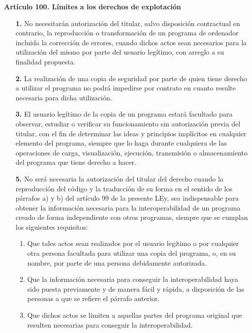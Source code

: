 \textbf{Artículo 100. Límites a los derechos de explotación}
\begin{itemize}
    \item[\textbf{1.}] No necesitarán autorización del titular, salvo disposición contractual en contrario, la reproducción o transformación de un programa de ordenador incluida la corrección de errores, cuando dichos actos sean necesarios para la utilización del mismo por parte del usuario legítimo, con arreglo a su finalidad propuesta.
    \item[\textbf{2.}] La realización de una copia de seguridad por parte de quien tiene derecho a utilizar el programa no podrá impedirse por contrato en cuanto resulte necesaria para dicha utilización.
    \item[\textbf{3.}] El usuario legítimo de la copia de un programa estará facultado para observar, estudiar o verificar su funcionamiento sin autorización previa del titular, con el fin de determinar las ideas y principios implícitos en cualquier elemento del programa, siempre que lo haga durante cualquiera de las operaciones de carga, visualización, ejecución, transmisión o almacenamiento del programa que tiene derecho a hacer.
    \item[\textbf{5.}] No será necesaria la autorización del titular del derecho cuando la reproducción del código y la traducción de su forma en el sentido de los párrafos a) y b)  del artículo 99 de la presente LEy, sea indispensable para obtener la información necesaria para la interoperabilidad de un programa creado de forma independiente con otros programas, siempre que se cumplan los siguientes requisitos:
        \begin{enumerate}[label=\textbf{\alph*)}]
            \item Que tales actos sean realizados por el usuario legítimo o por cualquier otra persona facultada para utilizar una copia del programa, o, en su nombre, por parte de una persona debidamente autorizada.
            \item Que la información necesaria para conseguir la interoperabilidad haya sido puesta previamente y de manera fácil y rápida, a disposición de las personas a que se refiere el párrafo anterior.
            \item Que dichos actos se limiten a aquellas partes del programa original que resulten necesarias para conseguir la interoperabilidad.
        \end{enumerate}
\end{itemize}

